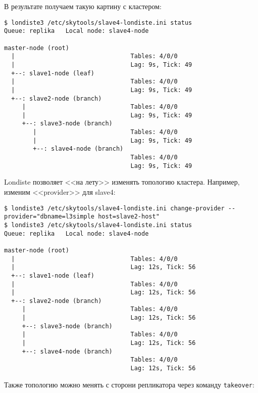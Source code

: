 В результате получаем такую картину с кластером:

\begin{lstlisting}[label=lst:londiste-cascade6,caption=Кластер с каскадной репликацией]
$ londiste3 /etc/skytools/slave4-londiste.ini status
Queue: replika   Local node: slave4-node

master-node (root)
  |                                Tables: 4/0/0
  |                                Lag: 9s, Tick: 49
  +--: slave1-node (leaf)
  |                                Tables: 4/0/0
  |                                Lag: 9s, Tick: 49
  +--: slave2-node (branch)
     |                             Tables: 4/0/0
     |                             Lag: 9s, Tick: 49
     +--: slave3-node (branch)
        |                          Tables: 4/0/0
        |                          Lag: 9s, Tick: 49
        +--: slave4-node (branch)
                                   Tables: 4/0/0
                                   Lag: 9s, Tick: 49
\end{lstlisting}

Londiste позволяет <<на лету>> изменять топологию кластера. Например, изменим <<provider>> для slave4:

\begin{lstlisting}[label=lst:londiste-cascade7,caption=Изменяем топологию]
$ londiste3 /etc/skytools/slave4-londiste.ini change-provider --provider="dbname=l3simple host=slave2-host"
$ londiste3 /etc/skytools/slave4-londiste.ini status
Queue: replika   Local node: slave4-node

master-node (root)
  |                                Tables: 4/0/0
  |                                Lag: 12s, Tick: 56
  +--: slave1-node (leaf)
  |                                Tables: 4/0/0
  |                                Lag: 12s, Tick: 56
  +--: slave2-node (branch)
     |                             Tables: 4/0/0
     |                             Lag: 12s, Tick: 56
     +--: slave3-node (branch)
     |                             Tables: 4/0/0
     |                             Lag: 12s, Tick: 56
     +--: slave4-node (branch)
                                   Tables: 4/0/0
                                   Lag: 12s, Tick: 56
\end{lstlisting}

Также топологию можно менять с сторони репликатора через команду \lstinline!takeover!:


